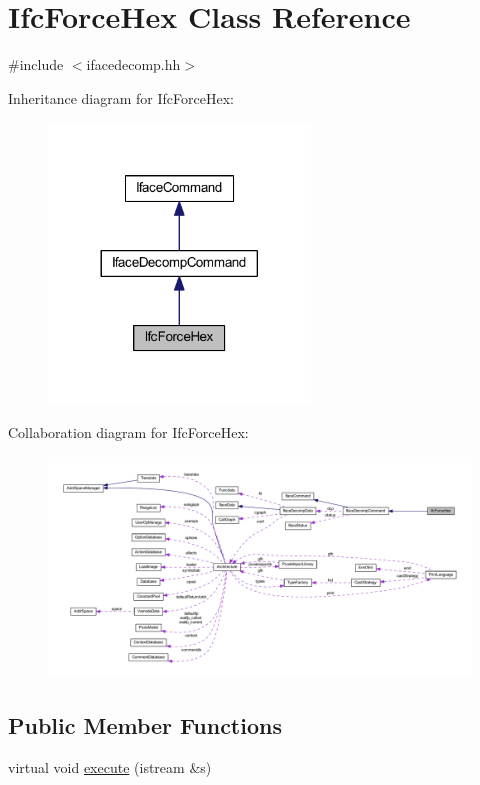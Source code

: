 \hypertarget{class_ifc_force_hex}{}\section{Ifc\+Force\+Hex Class Reference}
\label{class_ifc_force_hex}


{\ttfamily \#include $<$ifacedecomp.\+hh$>$}



Inheritance diagram for Ifc\+Force\+Hex\+:
\nopagebreak
\begin{figure}[H]
\begin{center}
\leavevmode
\includegraphics[width=197pt]{class_ifc_force_hex__inherit__graph}
\end{center}
\end{figure}


Collaboration diagram for Ifc\+Force\+Hex\+:
\nopagebreak
\begin{figure}[H]
\begin{center}
\leavevmode
\includegraphics[width=350pt]{class_ifc_force_hex__coll__graph}
\end{center}
\end{figure}
\subsection*{Public Member Functions}
\begin{DoxyCompactItemize}
\item 
virtual void \mbox{\hyperlink{class_ifc_force_hex_aeff89103d37c60da98f84ad8fbd0b4b1}{execute}} (istream \&s)
\end{DoxyCompactItemize}

